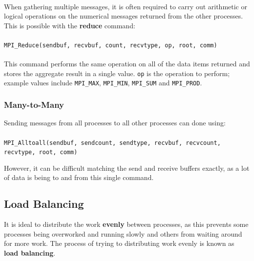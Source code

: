 \documentclass{article}
\begin{document}
\paragraph{}

When gathering multiple messages, it is often required to carry out arithmetic or logical operations on the numerical messages returned from the other processes. This is possible with the \textbf{reduce} command:

\paragraph{} \texttt{MPI\_Reduce(sendbuf, recvbuf, count, recvtype, op, root, comm)}
\paragraph{}

This command performs the same operation on all of the data items returned and stores the aggregate result in a single value. \texttt{op} is the operation to perform; example values include \texttt{MPI\_MAX}, \texttt{MPI\_MIN}, \texttt{MPI\_SUM} and \texttt{MPI\_PROD}.		

\subsubsection{Many-to-Many}

Sending messages from all processes to all other processes can done using:

\paragraph{} \texttt{MPI\_Alltoall(sendbuf, sendcount, sendtype, recvbuf, recvcount, recvtype, root, comm)}

However, it can be difficult matching the send and receive buffers exactly, as a lot of data is being to and from this single command.

\subsection{Load Balancing}

It is ideal to distribute the work \textbf{evenly} between processes, as this prevents some processes being overworked and running slowly and others from waiting around for more work. The process of trying to distributing work evenly is known as \textbf{load balancing}.
\end{document}
